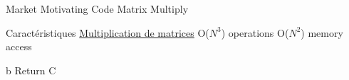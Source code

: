 %
\begin{Frame}{Market Motivating Code Matrix Multiply}

      \begin{block}{Caractéristiques
          \href{https://en.wikipedia.org/wiki/Matrix_multiplication_algorithm}{Multiplication de matrices}
 O($N^3$) operations O($N^2$) memory access}

\begin{algorithm}[H]
b
Return C
\end{algorithm}
      \end{block}   

\end{Frame}


